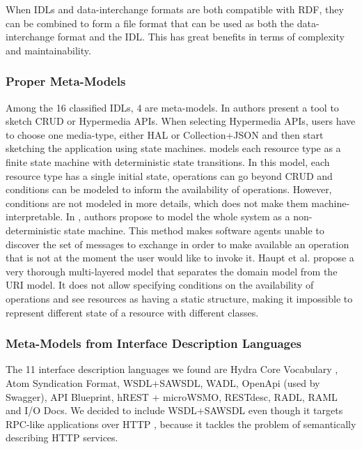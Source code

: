 When IDLs and data-interchange formats are both compatible with RDF, they can be combined to form a file format that can be used as both the data-interchange format and the IDL. This has great benefits in terms of complexity and maintainability.

\subsubsection{Proper Meta-Models}

Among the 16 classified IDLs, 4 are meta-models. In \cite{Rapido} authors present a tool to sketch CRUD or Hypermedia APIs. When selecting Hypermedia APIs, users have to choose one media-type, either HAL or Collection+JSON and then start sketching the application using state machines. \cite{Schreier:2011:MRA:1967428.1967434} models each resource type as a finite state machine with deterministic state transitions. In this model, each resource type has a single initial state, operations can go beyond CRUD and conditions can be modeled to inform the availability of operations. However, conditions are not modeled in more details, which does not make them machine-interpretable. In \cite{10.1007/978-3-642-22233-7_24}, authors propose to model the whole system as a non-deterministic state machine. This method makes software agents unable to discover the set of messages to exchange in order to make available an operation that is not at the moment the user would like to invoke it. Haupt et al. \cite{10.1109/ICWS.2014.30} propose a very thorough multi-layered model that separates the domain model from the URI model. It does not allow specifying conditions on the availability of operations and see resources as having a static structure, making it impossible to represent different state of a resource with different classes. 

\subsubsection{Meta-Models from Interface Description Languages}

The 11 interface description languages we found are Hydra Core Vocabulary \cite{Lanthaler:2013:CGW:2487788.2487799}, Atom Syndication Format\cite{AtomSF}, WSDL+SAWSDL, WADL, OpenApi (used by Swagger), API Blueprint, hREST + microWSMO, RESTdesc, RADL, RAML and I/O Docs. We decided to include WSDL+SAWSDL even though it targets RPC-like applications over HTTP \cite{john2012framework}, because it tackles the problem of semantically describing HTTP services.

